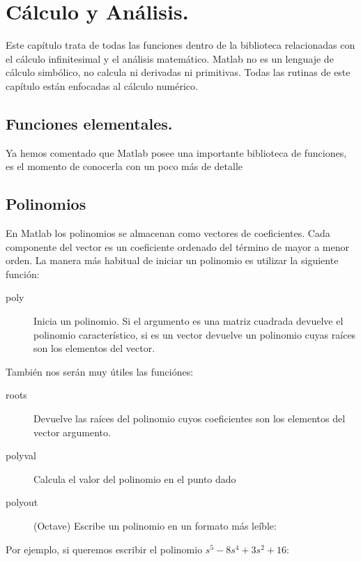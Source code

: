 
\chapter{Cálculo y Análisis.}


Este capítulo trata de todas las funciones dentro de la biblioteca
relacionadas con el cálculo infinitesimal y el análisis matemático.
Matlab no es un lenguaje de cálculo simbólico, no calcula ni derivadas
ni primitivas. Todas las rutinas de este capítulo están enfocadas
al cálculo numérico.


\section{Funciones elementales.}

Ya hemos comentado que Matlab posee una importante biblioteca de funciones,
es el momento de conocerla con un poco más de detalle


\section{Polinomios}

En Matlab los polinomios se almacenan como vectores de coeficientes.
Cada componente del vector es un coeficiente ordenado del término de
mayor a menor orden. La manera más habitual de iniciar un polinomio es
utilizar la siguiente función:

\begin{description}
\item [poly\texttt{}]Inicia un polinomio. Si el argumento
  es una matriz cuadrada devuelve el polinomio característico, si es
  un vector devuelve un polinomio cuyas raíces son los elementos del
  vector.
\end{description}
También nos serán muy útiles las funciónes:

\begin{description}
\item [roots\texttt{}]Devuelve las raíces del polinomio
  cuyos coeficientes son los elementos del vector argumento.
\item [polyval\texttt{}]Calcula el valor del polinomio
  en el punto dado
\item [polyout\texttt{}](Octave) Escribe un polinomio
  en un formato más leíble:
\end{description}
Por ejemplo, si queremos escribir el polinomio
$s^{5}-8s^{4}+3s^{2}+16$:

